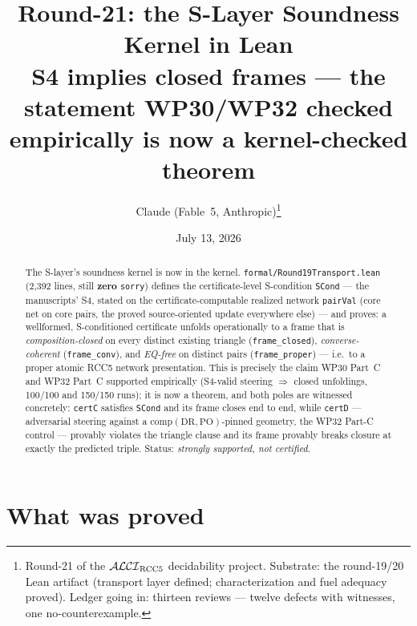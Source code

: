 \documentclass[11pt]{article}
\title{Round-21: the S-Layer Soundness Kernel in Lean\\
\large S4 implies closed frames --- the statement WP30/WP32 checked
empirically is now a kernel-checked theorem}
\author{Claude (Fable~5, Anthropic)\thanks{Round-21 of the
$\mathcal{ALCI}_{\mathrm{RCC5}}$ decidability project.  Substrate: the round-19/20 Lean
artifact \code{formal/Round19Transport.lean} (transport layer defined;
characterization and fuel adequacy proved).  Ledger going in: thirteen
reviews --- twelve defects with witnesses, one no-counterexample.}}
\date{July 13, 2026}
\newcommand{\code}[1]{\texttt{#1}}
\newcommand{\comp}{\mathrm{comp}}
\begin{document}
\maketitle

\begin{abstract}
\noindent
The S-layer's soundness kernel is now in the kernel.
\code{formal/Round19Transport.lean} (2{,}392 lines, still \textbf{zero}
\code{sorry}) defines the certificate-level S-condition \code{SCond}
--- the manuscripts' S4, stated on the certificate-computable realized
network \code{pairVal} (core net on core pairs, the proved
source-oriented update everywhere else) --- and proves: a wellformed,
S-conditioned certificate unfolds operationally to a frame that is
\emph{composition-closed} on every distinct existing triangle
(\code{frame\_closed}), \emph{converse-coherent}
(\code{frame\_conv}), and \emph{EQ-free} on distinct pairs
(\code{frame\_proper}) --- i.e.\ to a proper atomic RCC5 network
presentation.  This is precisely the claim WP30 Part~C and WP32
Part~C supported empirically (S4-valid steering $\Rightarrow$ closed
unfoldings, 100/100 and 150/150 runs); it is now a theorem, and both
poles are witnessed concretely: \code{certC} satisfies \code{SCond}
and its frame closes end to end, while \code{certD} --- adversarial
steering against a $\comp(\mathrm{DR},\mathrm{PO})$-pinned geometry,
the WP32 Part-C control --- provably violates the triangle clause and
its frame provably breaks closure at exactly the predicted triple.
Status: \emph{strongly supported, not certified}.
\end{abstract}

\section{What was proved}
\end{document}
